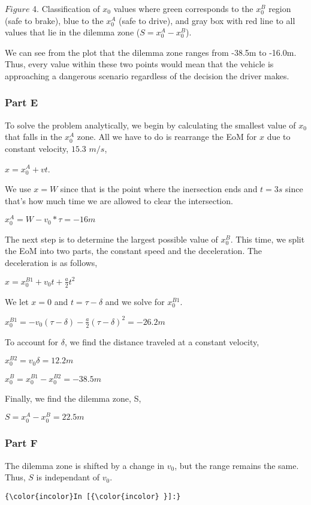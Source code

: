 \documentclass[11pt]{article}
\begin{document}
    \(Figure\) 4. Classification of \(x_0\) values where green corresponds
to the \(x_0^B\) region (safe to brake), blue to the \(x_0^A\) (safe to
drive), and gray box with red line to all values that lie in the dilemma
zone (\(S = x_0^A - x_0^B\)).

    We can see from the plot that the dilemma zone ranges from -38.5m to
-16.0m. Thus, every value within these two points would mean that the
vehicle is approaching a dangerous scenario regardless of the decision
the driver makes.

    \subsubsection{Part E}\label{part-e}

    To solve the problem analytically, we begin by calculating the smallest
value of \(x_0\) that falls in the \(x_0^A\) zone. All we have to do is
rearrange the EoM for \(x\) due to constant velocity, \(15.3\) \(m/s\),

\(x = x_0^A + vt\).

We use \(x=W\) since that is the point where the inersection ends and
\(t=3s\) since that's how much time we are allowed to clear the
intersection.

\(x_0^A = W - v_0*\tau = -16m\)

    The next step is to determine the largest possible value of \(x_0^B\).
This time, we split the EoM into two parts, the constant speed and the
deceleration. The deceleration is as follows,

\(x=x_0^{B1} + v_0t + \frac{a}{2} t^2\)

    We let \(x=0\) and \(t=\tau - \delta\) and we solve for \(x_0^{B1}\).

    \(x_0^{B1} = -v_0 (\tau - \delta) - \frac{a}{2} (\tau - \delta)^2 = -26.2m\)

    To account for \(\delta\), we find the distance traveled at a constant
velocity,

    \(x_0^{B2} = v_0 \delta = 12.2m\)

    \(x_0^B = x_0^{B1} - x_0^{B2} = -38.5m\)

    Finally, we find the dilemma zone, S,

\(S = x_0^A - x_0^B = 22.5m\)

    \subsubsection{Part F}\label{part-f}

    The dilemma zone is shifted by a change in \(v_0\), but the range
remains the same. Thus, \(S\) is independant of \(v_0\).

    \begin{Verbatim}[commandchars=\\\{\}]
{\color{incolor}In [{\color{incolor} }]:} 
\end{Verbatim}


    
    
    
    
\end{document}
